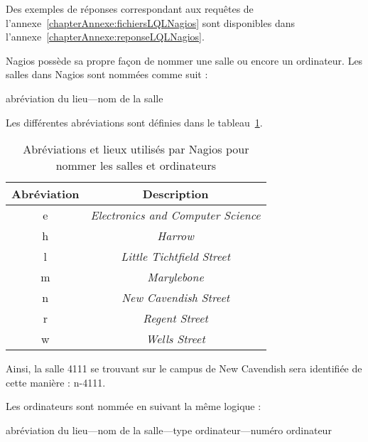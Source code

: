 \vspace{0.20cm}

Des exemples de r\'eponses correspondant aux requ\^etes de l'annexe~\ref{chapterAnnexe:fichiersLQLNagios} sont disponibles dans l'annexe~\ref{chapterAnnexe:reponseLQLNagios}.

Nagios poss\`ede sa propre fa\c{c}on de nommer une salle ou encore un ordinateur.
\noindent Les salles dans Nagios sont nomm\'ees comme suit : 

\begin{center}
	\textsf{abr\'eviation du lieu---nom de la salle}

\end{center}

\noindent Les diff\'erentes abr\'eviations sont d\'efinies dans le tableau~\ref{table:abreviation}.

\clearpage

\begin{table}[!ht]
	\centering
	\begin{tabular}{|c|c|}
		\hline
		\rowcolor{grisclair} \textbf{Abr\'eviation} & \textbf{Description}\\
		\hline
		e & \textit{Electronics and Computer Science}\\
		\hline
		h & \textit{Harrow}\\
		\hline
		l & \textit{Little Tichtfield Street}\\
		\hline
		m & \textit{Marylebone}\\
		\hline
		n & \textit{New Cavendish Street}\\
		\hline
		r & \textit{Regent Street}\\
		\hline
		w & \textit{Wells Street}\\
		\hline
	
	\end{tabular}
	
	\caption{Abr\'eviations et lieux utilis\'es par Nagios pour nommer les salles et ordinateurs}
	\label{table:abreviation}

\end{table}

Ainsi, la salle \textsf{4111} se trouvant sur le campus de New Cavendish sera identifi\'ee de cette mani\`ere : \textsf{n-4111}.

\noindent Les ordinateurs sont nomm\'ee en suivant la m\^eme logique :

\begin{center}
	\textsf{abr\'eviation du lieu---nom de la salle---type ordinateur---num\'ero ordinateur}
	
\end{center}

